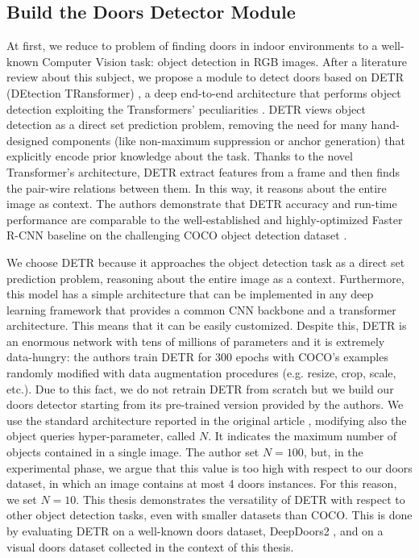 \subsection{Build the Doors Detector Module} At first, we reduce to problem of finding doors in indoor environments to a well-known Computer Vision task: object detection in RGB images. After a literature review about this subject, we propose a module to detect doors based on DETR (DEtection TRansformer) \cite{detr}, a deep end-to-end architecture that performs object detection exploiting the Transformers' peculiarities \cite{transformer}. DETR views object detection as a direct set prediction problem, removing the need for many hand-designed components (like non-maximum suppression or anchor generation) that explicitly encode prior knowledge about the task. Thanks to the novel Transformer's architecture, DETR extract features from a frame and then finds the pair-wire relations between them. In this way, it reasons about the entire image as context. The authors demonstrate that DETR accuracy and run-time performance are comparable to the well-established and highly-optimized Faster R-CNN baseline \cite{fasterrcnn} on the challenging COCO object detection dataset \cite{coco}. 

We choose DETR because it approaches the object detection task as a direct set prediction problem, reasoning about the entire image as a context. Furthermore, this model has a simple architecture that can be implemented in any deep learning framework that provides a common CNN backbone and a transformer architecture. This means that it can be easily customized. Despite this, DETR is an enormous network with tens of millions of parameters and it is extremely data-hungry: the authors train DETR for 300 epochs with COCO's examples randomly modified with data augmentation procedures (e.g. resize, crop, scale, etc.). Due to this fact, we do not retrain DETR from scratch but we build our doors detector starting from its pre-trained version provided by the authors. We use the standard architecture reported in the original article \cite{detr}, modifying also the object queries hyper-parameter, called $N$. It indicates the maximum number of objects contained in a single image. The author set $N = 100$, but, in the experimental phase, we argue that this value is too high with respect to our doors dataset, in which an image contains at most 4 doors instances. For this reason, we set $N = 10$. This thesis demonstrates the versatility of DETR with respect to other object detection tasks, even with smaller datasets than COCO. This is done by evaluating DETR on a well-known doors dataset, DeepDoors2 \cite{deepdoors2}, and on a visual doors dataset collected in the context of this thesis.

